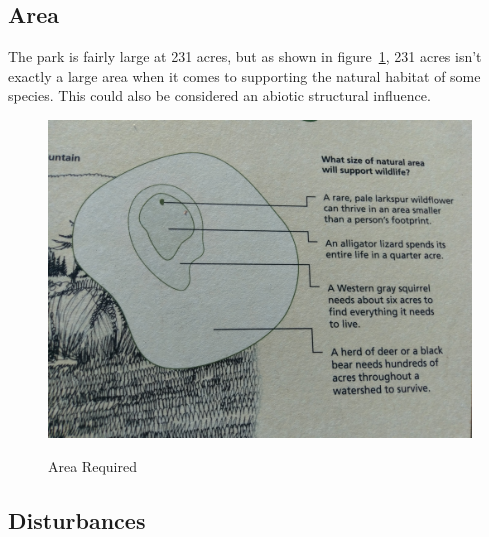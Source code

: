 \documentclass{article}
\begin{document}
\subsection{Area}
The park is fairly large at 231 acres, but as shown in figure~\ref{area}, 231 acres
isn't exactly a large area when it comes to supporting the natural habitat of some 
species. This could also be considered an abiotic structural influence.
\begin{figure}[H]
\centering{}
\caption{Area Required}
\includegraphics[scale=0.05]{size_to_support_sign.jpg}
\label{area}
\end{figure}
\newpage


\subsection{Disturbances}
\end{document}
